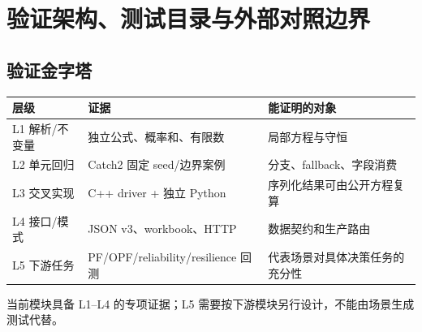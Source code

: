 \section{验证架构、测试目录与外部对照边界}
\label{sec:scenario-validation-architecture}

\subsection{验证金字塔}
\begin{center}\small
\begin{tabular}{@{}L{3.2cm}L{5.3cm}L{5.8cm}@{}}
\toprule
层级 & 证据 & 能证明的对象\\
\midrule
L1 解析/不变量 & 独立公式、概率和、有限数 & 局部方程与守恒\\
L2 单元回归 & Catch2 固定 seed/边界案例 & 分支、fallback、字段消费\\
L3 交叉实现 & C++ driver + 独立 Python & 序列化结果可由公开方程复算\\
L4 接口/模式 & JSON v3、workbook、HTTP & 数据契约和生产路由\\
L5 下游任务 & PF/OPF/reliability/resilience 回测 & 代表场景对具体决策任务的充分性\\
\bottomrule
\end{tabular}
\end{center}
当前模块具备 L1--L4 的专项证据；L5 需要按下游模块另行设计，不能由场景生成测试代替。

